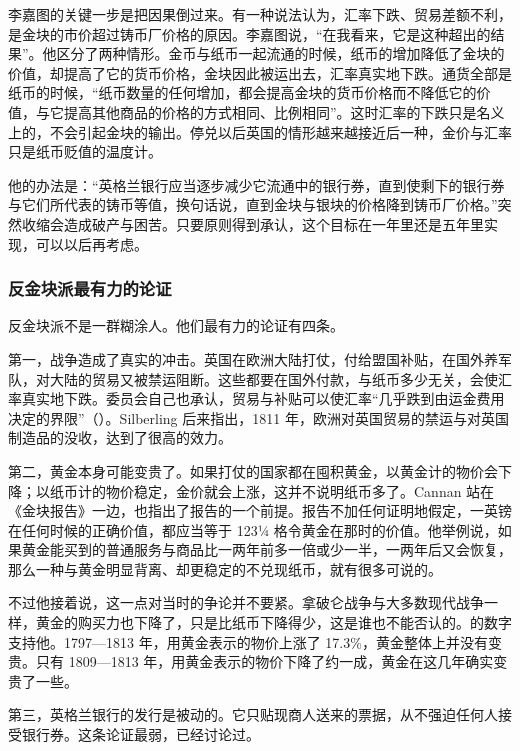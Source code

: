 李嘉图的关键一步是把因果倒过来。有一种说法认为，汇率下跌、贸易差额不利，是金块的市价超过铸币厂价格的原因。李嘉图说，“在我看来，它是这种超出的结果”\cite{ricardo1810}。他区分了两种情形。金币与纸币一起流通的时候，纸币的增加降低了金块的价值，却提高了它的货币价格，金块因此被运出去，汇率真实地下跌。通货全部是纸币的时候，“纸币数量的任何增加，都会提高金块的货币价格而不降低它的价值，与它提高其他商品的价格的方式相同、比例相同”\cite{ricardo1810}。这时汇率的下跌只是名义上的，不会引起金块的输出。停兑以后英国的情形越来越接近后一种，金价与汇率只是纸币贬值的温度计。

他的办法是：“英格兰银行应当逐步减少它流通中的银行券，直到使剩下的银行券与它们所代表的铸币等值，换句话说，直到金块与银块的价格降到铸币厂价格。”\cite{ricardo1810}突然收缩会造成破产与困苦。只要原则得到承认，这个目标在一年里还是五年里实现，可以以后再考虑\cite{ricardo1810}。

\subsubsection{反金块派最有力的论证}
反金块派不是一群糊涂人。他们最有力的论证有四条。

第一，战争造成了真实的冲击。英国在欧洲大陆打仗，付给盟国补贴，在国外养军队，对大陆的贸易又被禁运阻断。这些都要在国外付款，与纸币多少无关，会使汇率真实地下跌。委员会自己也承认，贸易与补贴可以使汇率“几乎跌到由运金费用决定的界限”（）。Silberling 后来指出，1811 年，欧洲对英国贸易的禁运与对英国制造品的没收，达到了很高的效力\cite{silberling1919}。

第二，黄金本身可能变贵了。如果打仗的国家都在囤积黄金，以黄金计的物价会下降；以纸币计的物价稳定，金价就会上涨，这并不说明纸币多了。Cannan 站在《金块报告》一边，也指出了报告的一个前提。报告不加任何证明地假定，一英镑在任何时候的正确价值，都应当等于 123¼ 格令黄金在那时的价值\cite{cannan1919}。他举例说，如果黄金能买到的普通服务与商品比一两年前多一倍或少一半，一两年后又会恢复，那么一种与黄金明显背离、却更稳定的不兑现纸币，就有很多可说的\cite{cannan1919}。

不过他接着说，这一点对当时的争论并不要紧。拿破仑战争与大多数现代战争一样，黄金的购买力也下降了，只是比纸币下降得少，这是谁也不能否认的\cite{cannan1919}。的数字支持他。1797—1813 年，用黄金表示的物价上涨了 17.3\%，黄金整体上并没有变贵。只有 1809—1813 年，用黄金表示的物价下降了约一成，黄金在这几年确实变贵了一些。

第三，英格兰银行的发行是被动的。它只贴现商人送来的票据，从不强迫任何人接受银行券。这条论证最弱，已经讨论过。

